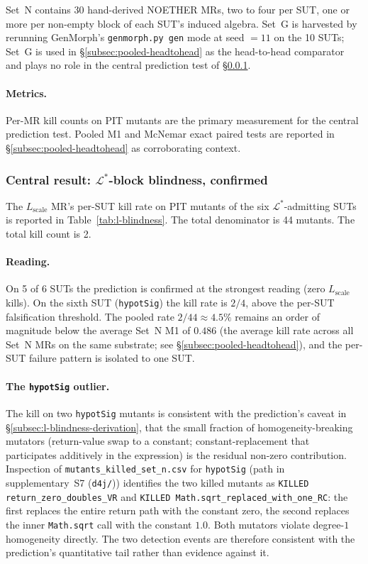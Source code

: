 \documentclass[manuscript]{acmart}
\begin{document}
Set~N contains 30 hand-derived NOETHER MRs, two to four per SUT, one
or more per non-empty block of each SUT's induced algebra. Set~G is
harvested by rerunning GenMorph's \texttt{genmorph.py gen} mode at
seed $=11$ on the 10 SUTs; Set~G is used in
\S\ref{subsec:pooled-headtohead} as the head-to-head comparator and
plays no role in the central prediction test of
\S\ref{subsec:l-blindness-confirmed}.

\paragraph{Metrics.}
Per-MR kill counts on PIT mutants are the primary measurement for the
central prediction test. Pooled M1 and McNemar exact paired tests are
reported in \S\ref{subsec:pooled-headtohead} as corroborating
context.

\subsubsection{Central result: \texorpdfstring{$\mathcal{L}^{*}$}{L*}-block blindness, confirmed}
\label{subsec:l-blindness-confirmed}

The $L_{\mathrm{scale}}$ MR's per-SUT kill rate on PIT mutants of the
six $\mathcal{L}^{*}$-admitting SUTs is reported in
Table~\ref{tab:l-blindness}. The total denominator is 44 mutants. The
total kill count is 2.

\paragraph{Reading.}
On 5 of 6 SUTs the prediction is confirmed at the strongest reading
(zero $L_{\mathrm{scale}}$ kills). On the sixth SUT
(\texttt{hypotSig}) the kill rate is $2/4$, above the per-SUT
falsification threshold. The pooled rate $2/44 \approx 4.5\%$ remains
an order of magnitude below the average Set~N M1 of $0.486$ (the
average kill rate across all Set~N MRs on the same substrate; see
\S\ref{subsec:pooled-headtohead}), and the per-SUT failure pattern is
isolated to one SUT.

\paragraph{The \texttt{hypotSig} outlier.}
The kill on two \texttt{hypotSig} mutants is consistent with the
prediction's caveat in \S\ref{subsec:l-blindness-derivation}, that
the small fraction of homogeneity-breaking mutators (return-value
swap to a constant; constant-replacement that participates additively
in the expression) is the residual non-zero contribution. Inspection
of \texttt{mutants\_killed\_set\_n.csv} for \texttt{hypotSig} (path
in supplementary~S7 (\texttt{d4j/})) identifies the two killed mutants as
\texttt{KILLED\,return\_zero\_doubles\_VR} and
\texttt{KILLED\,Math.sqrt\_replaced\_with\_one\_RC}: the first
replaces the entire return path with the constant zero, the second
replaces the inner \texttt{Math.sqrt} call with the constant $1.0$.
Both mutators violate degree-$1$ homogeneity directly. The two
detection events are therefore consistent with the prediction's
quantitative tail rather than evidence against it.
\end{document}
